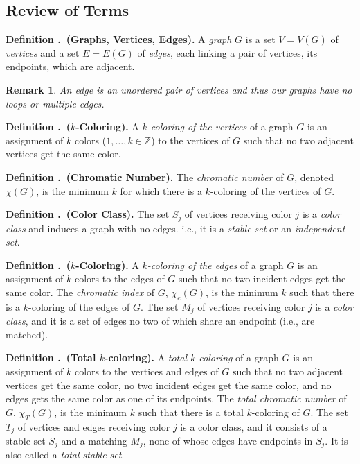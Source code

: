 \documentclass[12pt, letterpaper]{article}
\newcounter{index}[subsection]
\newenvironment*{df}[1]{\par\noindent\textbf{Definition \thesection.\stepcounter{index}\theindex\ (#1).}}{\par}
\newtheorem{rmk}{Remark}[section]
\def\Z{{\mathbb{Z}}}
\begin{document}
\subsection{Review of Terms}
\begin{df}{Graphs, Vertices, Edges}
	A \textit{graph} $G$ is a set $V=V(G)$ of \textit{vertices} and a set $E=E(G)$ of \textit{edges}, each linking a pair of vertices, its endpoints, which are adjacent. 	
\end{df}
\begin{rmk}
	An edge is an unordered pair of vertices and thus our graphs have no loops or multiple edges.	
\end{rmk}
\begin{df}{$k$-Coloring}
	A \textit{$k$-coloring of the vertices} of a graph $G$ is an assignment of $k$ colors ($1,\dots,k\in\Z$) to the vertices of $G$ such that no two adjacent vertices get the same color.	
\end{df}
\begin{df}{Chromatic Number}
	The \textit{chromatic number} of $G$, denoted $\chi(G)$, is the minimum $k$ for which there is a $k$-coloring of the vertices of $G$. 
\end{df}
\begin{df}{Color Class}
	The set $S_j$ of vertices receiving color $j$ is a \textit{color class} and induces a graph with no edges. i.e., it is a \textit{stable set} or an \textit{independent set}. 
\end{df}
\begin{df}{$k$-Coloring}
	A \textit{$k$-coloring of the edges} of a graph $G$ is an assignment of $k$ colors to the edges of $G$ such that no two incident edges get the same color. The \textit{chromatic index} of $G$, $\chi_e(G)$, is the minimum $k$ such that there is a $k$-coloring of the edges of $G$. The set $M_j$ of vertices receiving color $j$ is a \textit{color class}, and it is a set of edges no two of which share an endpoint (i.e., are matched).
\end{df}
\begin{df}{Total $k$-coloring}
	A \textit{total $k$-coloring} of a graph $G$ is an assignment of $k$ colors to the vertices and edges of $G$ such that no two adjacent vertices get the same color, no two incident edges get the same color, and no edges gets the same color as one of its endpoints. The \textit{total chromatic number} of $G$, $\chi_T(G)$, is the minimum $k$ such that there is a total $k$-coloring of $G$. The set $T_j$ of vertices and edges receiving color $j$ is a color class, and it consists of a stable set $S_j$ and a matching $M_j$, none of whose edges have endpoints in $S_j$. It is also called a \textit{total stable set}.	
\end{df}
\end{document}
